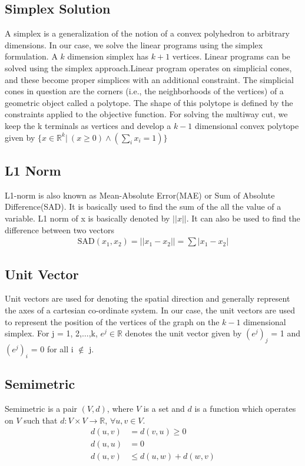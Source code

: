 \documentclass[11pt]{article}
\begin{document}
\subsection{Simplex Solution}
A simplex is a generalization of the notion of a convex polyhedron to arbitrary dimensions. In our case, we solve the linear programs using the simplex formulation. A $k$ dimension simplex has $k + 1$ vertices. Linear programs can be solved using the simplex approach.Linear program operates on simplicial cones, and these become proper simplices with an additional constraint. The simplicial cones in question are the corners (i.e., the neighborhoods of the vertices) of a geometric object called a polytope. The shape of this polytope is defined by the constraints applied to the objective function. For solving the multiway cut, we keep the k terminals as vertices and develop a $k-1$ dimensional convex polytope given by $\{x \in {\mathbb R}^k \vert \ (x \ge 0) \wedge (\sum_i x_i = 1) \}$

\subsection{L1 Norm}
L1-norm is also known as Mean-Absolute Error(MAE) or Sum of Absolute Difference(SAD). It is basically used to find the sum of the all the value of a variable. L1 norm of x is basically denoted by $\vert\vert x \vert\vert$. It can also be used to find the difference between two vectors
\begin{align*}
\text{SAD}(x_1, x_2) = \vert \vert x_1 - x_2 \vert \vert = \sum \vert x_1 - x_2 \vert
\end{align*}

\subsection{Unit Vector}
Unit vectors are used for denoting the spatial direction and generally represent the axes of a cartesian co-ordinate system. In our case, the unit vectors are used to represent the position of the vertices of the graph on the $k-1$ dimensional simplex. For j = 1, 2,$\dots$,k, $e^j \in \mathbb{R}$ denotes the unit vector given by $(e^j)_j$ = 1 and $(e^j)_i$ = 0 for all i $\notin$ j.

\subsection{Semimetric}
Semimetric is a pair $(V, d)$, where $V$ is a set and $d$ is a function which operates on $V$ such that $d: V \times V \rightarrow \mathbb{R}$, $\forall u,v \in V$.
\begin{align*}
d(u, v) &= d(v, u) \ge 0\\
d(u, u) &= 0\\
d(u,v) &\le d(u,w) + d(w,v) 
\end{align*}
\end{document}
